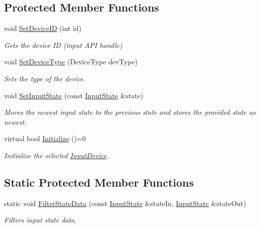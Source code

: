 \subsection*{Protected Member Functions}
\begin{DoxyCompactItemize}
\item 
void \hyperlink{class_blade_1_1_input_device_aa61d2df62fef1370b09ffb7469fc5da4}{Set\+Device\+ID} (int id)
\begin{DoxyCompactList}\small\item\em Gets the device ID (input A\+PI handle) \end{DoxyCompactList}\item 
void \hyperlink{class_blade_1_1_input_device_ab810d1917cee9709b339db1074d10e9a}{Set\+Device\+Type} (Device\+Type dev\+Type)
\begin{DoxyCompactList}\small\item\em Sets the type of the device. \end{DoxyCompactList}\item 
void \hyperlink{class_blade_1_1_input_device_a7e01bfa10e141d916b4459051a08b645}{Set\+Input\+State} (const \hyperlink{struct_blade_1_1_input_state}{Input\+State} \&state)
\begin{DoxyCompactList}\small\item\em Moves the newest input state to the previous state and stores the provided state as newest. \end{DoxyCompactList}\item 
virtual bool \hyperlink{class_blade_1_1_input_device_a701823a23160c1e4e169716647d6570b}{Initialize} ()=0
\begin{DoxyCompactList}\small\item\em Initialize the selected \hyperlink{class_blade_1_1_input_device}{Input\+Device}. \end{DoxyCompactList}\end{DoxyCompactItemize}
\subsection*{Static Protected Member Functions}
\begin{DoxyCompactItemize}
\item 
static void \hyperlink{class_blade_1_1_input_device_ad9d8a25471322063e459f7b13f328d20}{Filter\+State\+Data} (const \hyperlink{struct_blade_1_1_input_state}{Input\+State} \&state\+In, \hyperlink{struct_blade_1_1_input_state}{Input\+State} \&state\+Out)
\begin{DoxyCompactList}\small\item\em Filters input state data. \end{DoxyCompactList}\end{DoxyCompactItemize}


